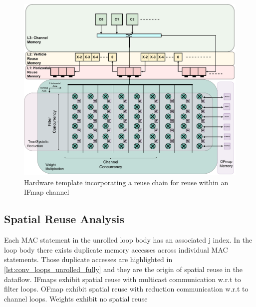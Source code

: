\begin{figure}[]
    \centering
    \includegraphics[scale=0.4]{fig/reuse_chain.pdf}
    \caption{Hardware template incorporating a reuse chain for reuse within an IFmap channel }
    \label{fig:reuse_chain}
\end{figure}


\subsection{Spatial Reuse Analysis}
\label{chap:dda:hw_dse:spatial_reuse_analysis}

Each MAC statement in the unrolled loop body has an associated j index. In the
loop body there exists duplicate memory accesses across individual \ac{MAC}
statements. Those duplicate accesses are highlighted in
\autoref{lst:conv_loops_unrolled_fully} and they are the origin of spatial reuse
in the dataflow. IFmaps exhibit spatial reuse with multicast communication w.r.t
to filter loops. OFmap exhibit spatial reuse with reduction communication
w.r.t to channel loops. Weights exhibit no spatial reuse 
 
